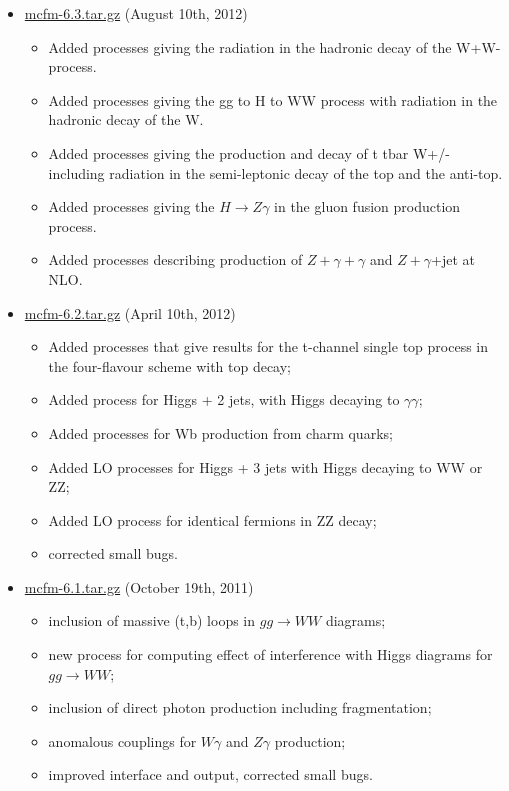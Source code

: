 \begin{itemize}
\item \href{https://mcfm.fnal.gov/downloads/mcfm-6.3.tar.gz}{mcfm-6.3.tar.gz} (August 10th, 2012)

\begin{itemize}
\item    Added processes giving the radiation in the hadronic decay of the W+W- process.
\item    Added processes giving the gg to H to WW process with radiation in the hadronic decay of the W.
\item    Added processes giving the production and decay of t tbar W+/- including radiation in the semi-leptonic decay of the top and the anti-top.
\item    Added processes giving the $H \to Z\gamma$ in the gluon fusion production process.
\item    Added processes describing production of $Z+\gamma+\gamma$ and $Z+\gamma$+jet at NLO. 
\end{itemize}

\item \href{https://mcfm.fnal.gov/downloads/mcfm-6.2.tar.gz}{mcfm-6.2.tar.gz} (April 10th, 2012)

\begin{itemize}
\item    Added processes that give results for the t-channel single top process in the four-flavour scheme with top decay;
\item    Added process for Higgs + 2 jets, with Higgs decaying to $\gamma\gamma$;
\item    Added processes for Wb production from charm quarks;
\item    Added LO processes for Higgs + 3 jets with Higgs decaying to WW or ZZ;
\item    Added LO process for identical fermions in ZZ decay;
\item    corrected small bugs. 
\end{itemize}

\item \href{https://mcfm.fnal.gov/downloads/mcfm-6.1.tar.gz}{mcfm-6.1.tar.gz} (October 19th, 2011)

\begin{itemize}
\item    inclusion of massive (t,b) loops in $gg \to WW$ diagrams;
\item    new process for computing effect of interference with Higgs diagrams for $gg \to WW$;
\item    inclusion of direct photon production including fragmentation;
\item    anomalous couplings for $W\gamma$ and $Z\gamma$ production;
\item    improved interface and output, corrected small bugs. 
\end{itemize}


\end{itemize}
